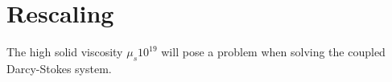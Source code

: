 \section{Rescaling}

The high solid viscosity $\mu_s 10^{19}$ will pose a problem when solving 
the coupled Darcy-Stokes system.
